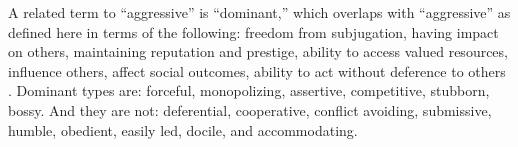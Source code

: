 \documentclass[11pt, letterpaper]{article}
\begin{document}
\begin{spacing}{2.0}
A related term to ``aggressive'' is ``dominant,'' %
which overlaps with ``aggressive'' as defined here in terms of the following:  %
 freedom from subjugation, having impact on
others,  maintaining reputation and prestige, ability to access valued resources,
influence others, affect social outcomes, ability to act without deference to others \citep{burgoon98,pratto08}.
 Dominant types %
 are: forceful, monopolizing, assertive, competitive, stubborn,
 bossy. And they are not: deferential, cooperative, conflict avoiding, submissive,
 humble, obedient, easily led, docile, and accommodating. %











\end{spacing}
\end{document}
